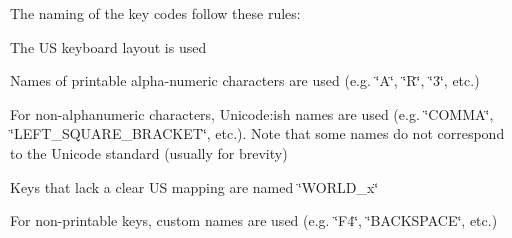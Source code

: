 \-The naming of the key codes follow these rules\-:
\begin{DoxyItemize}
\item \-The \-U\-S keyboard layout is used
\item \-Names of printable alpha-\/numeric characters are used (e.\-g. \char`\"{}\-A\char`\"{}, \char`\"{}\-R\char`\"{}, \char`\"{}3\char`\"{}, etc.)
\item \-For non-\/alphanumeric characters, \-Unicode\-:ish names are used (e.\-g. \char`\"{}\-C\-O\-M\-M\-A\char`\"{}, \char`\"{}\-L\-E\-F\-T\-\_\-\-S\-Q\-U\-A\-R\-E\-\_\-\-B\-R\-A\-C\-K\-E\-T\char`\"{}, etc.). \-Note that some names do not correspond to the \-Unicode standard (usually for brevity)
\item \-Keys that lack a clear \-U\-S mapping are named \char`\"{}\-W\-O\-R\-L\-D\-\_\-x\char`\"{}
\item \-For non-\/printable keys, custom names are used (e.\-g. \char`\"{}\-F4\char`\"{}, \char`\"{}\-B\-A\-C\-K\-S\-P\-A\-C\-E\char`\"{}, etc.) 
\end{DoxyItemize}